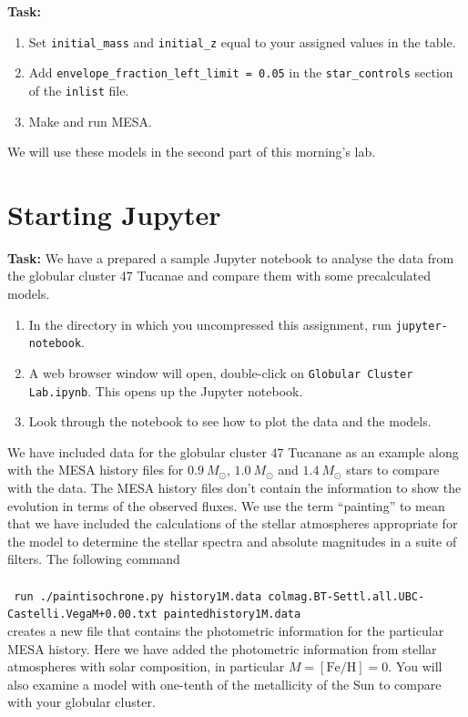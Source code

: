 \documentclass{article}
\begin{document}
{\bf Task:}
\begin{enumerate}
 \setlength\itemsep{0em}
    \item 
Set \texttt{initial\_mass} and \texttt{initial\_z} equal to your assigned values in the table.  
\item Add  \texttt{envelope\_fraction\_left\_limit = 0.05} in the \texttt{star\_controls} section of the \texttt{inlist} file. 
\item Make and run MESA.
\end{enumerate}
We will use these models in the second part of this morning's lab.

\section{Starting Jupyter}

\textbf{Task:} We have a prepared a sample Jupyter notebook to analyse the data from the globular cluster 47 Tucanae and compare them with some precalculated models.   
\begin{enumerate}
 \setlength\itemsep{0em}
\item
In the directory in which you uncompressed this assignment, run \texttt{jupyter-notebook}.
\item
A web browser window will open, double-click on \texttt{Globular Cluster Lab.ipynb}.  This opens up the Jupyter notebook.
\item
Look through the notebook to see how to plot the data and the models. 
\end{enumerate}
We have included data for the globular cluster 47 Tucanane as an example along with the MESA history files for  $0.9~M_\odot$, $1.0~M_\odot$ and $1.4~M_\odot$ stars to compare with the data.   The MESA history files don't contain the information to show the evolution in terms of the observed fluxes.  We use the term ``painting'' to mean that we have included the calculations of the stellar atmospheres appropriate for the model to determine the stellar spectra and absolute magnitudes in a suite of filters.  The following command \\
\\
{\small{
\texttt{
    run ./paintisochrone.py history1M.data colmag.BT-Settl.all.UBC-Castelli.VegaM+0.00.txt paintedhistory1M.data
}
}}\\
creates a new file that contains the photometric information for the particular MESA history.  Here we have added the photometric information from stellar atmospheres with solar composition, in particular $M=[\textrm{Fe/H}]=0$.  You will also examine a model with one-tenth of the metallicity of the Sun to compare with your globular cluster.
\end{document}
